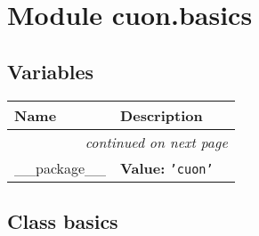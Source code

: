 %
%
%


\section{Module cuon.basics}

    \label{cuon:basics}


  \subsection{Variables}

    \vspace{-1cm}
\hspace{\varindent}\begin{longtable}{|p{\varnamewidth}|p{\vardescrwidth}|l}
\cline{1-2}
\cline{1-2} \centering \textbf{Name} & \centering \textbf{Description}& \\
\cline{1-2}
\endhead\cline{1-2}\multicolumn{3}{r}{\small\textit{continued on next page}}\\\endfoot\cline{1-2}
\endlastfoot\raggedright \_\-\_\-p\-a\-c\-k\-a\-g\-e\-\_\-\_\- & \raggedright \textbf{Value:} 
{\tt \texttt{'}\texttt{cuon}\texttt{'}}&\\
\cline{1-2}
\end{longtable}



\subsection{Class basics}

